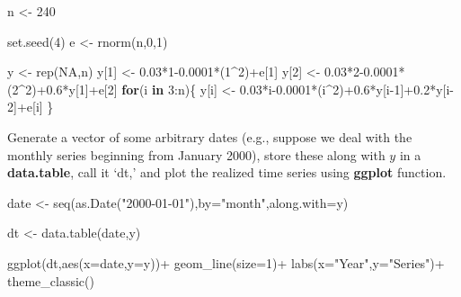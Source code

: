 \documentclass[
  12pt,
  oneside]{book}
\newenvironment{Shaded}{\begin{snugshade}}{\end{snugshade}}
\newcommand{\AttributeTok}[1]{\textcolor[rgb]{0.77,0.63,0.00}{#1}}
\newcommand{\ConstantTok}[1]{\textcolor[rgb]{0.00,0.00,0.00}{#1}}
\newcommand{\ControlFlowTok}[1]{\textcolor[rgb]{0.13,0.29,0.53}{\textbf{#1}}}
\newcommand{\DecValTok}[1]{\textcolor[rgb]{0.00,0.00,0.81}{#1}}
\newcommand{\FloatTok}[1]{\textcolor[rgb]{0.00,0.00,0.81}{#1}}
\newcommand{\FunctionTok}[1]{\textcolor[rgb]{0.00,0.00,0.00}{#1}}
\newcommand{\NormalTok}[1]{#1}
\newcommand{\OtherTok}[1]{\textcolor[rgb]{0.56,0.35,0.01}{#1}}
\newcommand{\SpecialCharTok}[1]{\textcolor[rgb]{0.00,0.00,0.00}{#1}}
\newcommand{\StringTok}[1]{\textcolor[rgb]{0.31,0.60,0.02}{#1}}
\begin{document}
\begin{Shaded}
\begin{Highlighting}[]
\NormalTok{n }\OtherTok{\textless{}{-}} \DecValTok{240}

\FunctionTok{set.seed}\NormalTok{(}\DecValTok{4}\NormalTok{)}
\NormalTok{e }\OtherTok{\textless{}{-}} \FunctionTok{rnorm}\NormalTok{(n,}\DecValTok{0}\NormalTok{,}\DecValTok{1}\NormalTok{)}

\NormalTok{y }\OtherTok{\textless{}{-}} \FunctionTok{rep}\NormalTok{(}\ConstantTok{NA}\NormalTok{,n)}
\NormalTok{y[}\DecValTok{1}\NormalTok{] }\OtherTok{\textless{}{-}} \FloatTok{0.03}\SpecialCharTok{*}\DecValTok{1}\FloatTok{{-}0.0001}\SpecialCharTok{*}\NormalTok{(}\DecValTok{1}\SpecialCharTok{\^{}}\DecValTok{2}\NormalTok{)}\SpecialCharTok{+}\NormalTok{e[}\DecValTok{1}\NormalTok{]}
\NormalTok{y[}\DecValTok{2}\NormalTok{] }\OtherTok{\textless{}{-}} \FloatTok{0.03}\SpecialCharTok{*}\DecValTok{2}\FloatTok{{-}0.0001}\SpecialCharTok{*}\NormalTok{(}\DecValTok{2}\SpecialCharTok{\^{}}\DecValTok{2}\NormalTok{)}\SpecialCharTok{+}\FloatTok{0.6}\SpecialCharTok{*}\NormalTok{y[}\DecValTok{1}\NormalTok{]}\SpecialCharTok{+}\NormalTok{e[}\DecValTok{2}\NormalTok{]}
\ControlFlowTok{for}\NormalTok{(i }\ControlFlowTok{in} \DecValTok{3}\SpecialCharTok{:}\NormalTok{n)\{}
\NormalTok{  y[i] }\OtherTok{\textless{}{-}} \FloatTok{0.03}\SpecialCharTok{*}\NormalTok{i}\FloatTok{{-}0.0001}\SpecialCharTok{*}\NormalTok{(i}\SpecialCharTok{\^{}}\DecValTok{2}\NormalTok{)}\SpecialCharTok{+}\FloatTok{0.6}\SpecialCharTok{*}\NormalTok{y[i}\DecValTok{{-}1}\NormalTok{]}\SpecialCharTok{+}\FloatTok{0.2}\SpecialCharTok{*}\NormalTok{y[i}\DecValTok{{-}2}\NormalTok{]}\SpecialCharTok{+}\NormalTok{e[i]}
\NormalTok{\}}
\end{Highlighting}
\end{Shaded}

Generate a vector of some arbitrary dates (e.g., suppose we deal with the monthly series beginning from January 2000), store these along with \(y\) in a \textbf{data.table}, call it `dt,' and plot the realized time series using \textbf{ggplot} function.

\begin{Shaded}
\begin{Highlighting}[]
\NormalTok{date }\OtherTok{\textless{}{-}} \FunctionTok{seq}\NormalTok{(}\FunctionTok{as.Date}\NormalTok{(}\StringTok{"2000{-}01{-}01"}\NormalTok{),}\AttributeTok{by=}\StringTok{"month"}\NormalTok{,}\AttributeTok{along.with=}\NormalTok{y)}

\NormalTok{dt }\OtherTok{\textless{}{-}} \FunctionTok{data.table}\NormalTok{(date,y)}

\FunctionTok{ggplot}\NormalTok{(dt,}\FunctionTok{aes}\NormalTok{(}\AttributeTok{x=}\NormalTok{date,}\AttributeTok{y=}\NormalTok{y))}\SpecialCharTok{+}
  \FunctionTok{geom\_line}\NormalTok{(}\AttributeTok{size=}\DecValTok{1}\NormalTok{)}\SpecialCharTok{+}
  \FunctionTok{labs}\NormalTok{(}\AttributeTok{x=}\StringTok{"Year"}\NormalTok{,}\AttributeTok{y=}\StringTok{"Series"}\NormalTok{)}\SpecialCharTok{+}
  \FunctionTok{theme\_classic}\NormalTok{()}
\end{Highlighting}
\end{Shaded}
\end{document}

